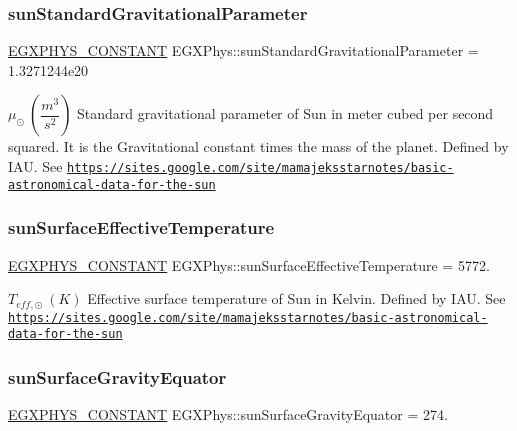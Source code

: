 \subsubsection{\texorpdfstring{sun\+Standard\+Gravitational\+Parameter}{sunStandardGravitationalParameter}}
{\footnotesize\ttfamily \mbox{\hyperlink{group___e_g_x_phys-_constants-_macros_ga76980d288494ce1714c9ac68a95ba702}{E\+G\+X\+P\+H\+Y\+S\+\_\+\+C\+O\+N\+S\+T\+A\+NT}} E\+G\+X\+Phys\+::sun\+Standard\+Gravitational\+Parameter = 1.\+3271244e20}

$ \mu_{\odot} \ (\dfrac{m^3}{s^2})$ Standard gravitational parameter of Sun in meter cubed per second squared. It is the Gravitational constant times the mass of the planet. Defined by I\+AU. See \href{https://sites.google.com/site/mamajeksstarnotes/basic-astronomical-data-for-the-sun}{\tt https\+://sites.\+google.\+com/site/mamajeksstarnotes/basic-\/astronomical-\/data-\/for-\/the-\/sun} \mbox{\label{group___e_g_x_phys-_constants-_astrophysics-_solar_system-_sun-_bulk_gac4f767d22333fd9a17ddd59e37d03545}} 
\subsubsection{\texorpdfstring{sun\+Surface\+Effective\+Temperature}{sunSurfaceEffectiveTemperature}}
{\footnotesize\ttfamily \mbox{\hyperlink{group___e_g_x_phys-_constants-_macros_ga76980d288494ce1714c9ac68a95ba702}{E\+G\+X\+P\+H\+Y\+S\+\_\+\+C\+O\+N\+S\+T\+A\+NT}} E\+G\+X\+Phys\+::sun\+Surface\+Effective\+Temperature = 5772.}

$ T_{eff,\odot} \ (K)$ Effective surface temperature of Sun in Kelvin. Defined by I\+AU. See \href{https://sites.google.com/site/mamajeksstarnotes/basic-astronomical-data-for-the-sun}{\tt https\+://sites.\+google.\+com/site/mamajeksstarnotes/basic-\/astronomical-\/data-\/for-\/the-\/sun} \mbox{\label{group___e_g_x_phys-_constants-_astrophysics-_solar_system-_sun-_bulk_ga041c4c2f7860c1b1fa4435b2be962c50}} 
\subsubsection{\texorpdfstring{sun\+Surface\+Gravity\+Equator}{sunSurfaceGravityEquator}}
{\footnotesize\ttfamily \mbox{\hyperlink{group___e_g_x_phys-_constants-_macros_ga76980d288494ce1714c9ac68a95ba702}{E\+G\+X\+P\+H\+Y\+S\+\_\+\+C\+O\+N\+S\+T\+A\+NT}} E\+G\+X\+Phys\+::sun\+Surface\+Gravity\+Equator = 274.}

